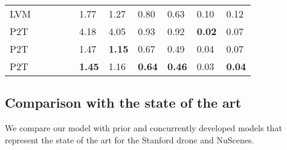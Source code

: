 \documentclass[journal]{IEEEtran}
\begin{document}
\begin{table*}[]
\begin{tabularx}{\textwidth}{l|YYYY|YYYYYY}
LVM                    &                      &                                                                          &                                                                                 &                                                                             & 1.77         & 1.27         & 0.80       & 0.63      & 0.10                                                                    & 0.12                                                                      \\
P2T                  &                      &                                                                      &                                                                             &                                                                                 & 4.18        & 4.05         & 0.93      & 0.92        & \textbf{0.02}                                                                     & 0.07                                                                       \\
P2T                 &                      &                                                                          &                                                                             &                                                                             & 1.47         & \textbf{1.15}         & 0.67       & 0.49      & 0.04                                                                    & 0.07                                                                      \\
P2T                &                      &                                                                      &                                                                             &                                                                             & \textbf{1.45}         & 1.16         & \textbf{0.64}       & \textbf{0.46}      & 0.03                                                                    & \textbf{0.04}                                                                      \\ \bottomrule
\end{tabularx}
\label{tab:abl_ns}
\end{table*}


\subsection{Comparison with the state of the art}
We compare our model with prior and concurrently developed models that represent the state of the art for the Stanford drone and NuScenes. 
\end{document}
